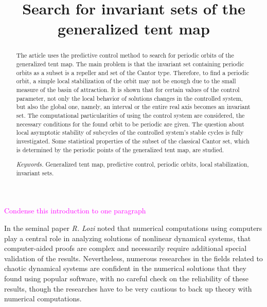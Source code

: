 \documentclass[12pt,a4paper]{amsart}
\begin{document}
\title{Search for invariant sets of the generalized tent map}

\begin{abstract}
The article uses the predictive control method to search for periodic orbits of the generalized tent map. The main problem is that 
the invariant set containing periodic orbits as a subset is a repeller and set of the Cantor type. Therefore, to find a periodic orbit, 
a simple local stabilization of the orbit may not be enough due to the small measure of the basin of attraction. It is shown that for 
certain values of the control parameter, not only the local behavior of solutions changes in the controlled system, but also the global 
one, namely, an interval or the entire real axis becomes an invariant set. The computational particularities of using the control system 
are considered, the necessary conditions for the found orbit to be periodic are given. The question about local asymptotic stability of 
subcycles of the controlled system's stable cycles is fully investigated. Some statistical properties of the subset of the classical 
Cantor set, which is determined by the periodic points of the generalized tent map, are studied.

\medskip
\noindent \textit{Keywords.} Generalized tent map, predictive control, periodic orbits, local stabilization, invariant sets.  
\end{abstract}


\maketitle

\section*{}

\textcolor{magenta}{Condense this introduction to one paragraph}

In the seminal paper \cite{Lozi} \textit{R. Lozi} noted that numerical computations using computers play a central role in analyzing 
solutions of nonlinear dynamical systems, that computer-aided proofs are complex and necessarily require additional special 
validation of the results. Nevertheless, numerous researches in the fields related to chaotic dynamical systems are confident 
in the numerical solutions that they found using popular software, with no careful check on the reliability of these results, though 
the researches have to be very cautious to back up theory with numerical computations.
\end{document}
